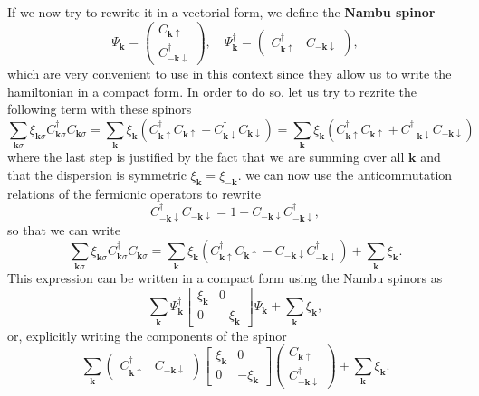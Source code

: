 If we now try to rewrite it in a vectorial form, we define the \textbf{Nambu spinor}
\[
    \Psi_{\mathbf{k}} = \begin{pmatrix}
        C_{\mathbf{k} \uparrow} \\
        C^{\dagger}_{-\mathbf{k} \downarrow}
    \end{pmatrix}, \quad \Psi_{\mathbf{k}}^\dagger = \begin{pmatrix}
        C^{\dagger}_{\mathbf{k} \uparrow} & C_{-\mathbf{k} \downarrow}
    \end{pmatrix},
\]
which are very convenient to use in this context since they allow us to write the hamiltonian in a compact form. In order to do so, let us try to rezrite the following term with these spinors
\[
    \sum_{\mathbf{k} \sigma} \xi_{\mathbf{k}\sigma} C^{\dagger}_{\mathbf{k} \sigma} C_{\mathbf{k} \sigma} = \sum_{\mathbf{k}} \xi_{\mathbf{k}} (C^{\dagger}_{\mathbf{k} \uparrow} C_{\mathbf{k} \uparrow} + C^{\dagger}_{\mathbf{k} \downarrow} C_{\mathbf{k} \downarrow}) = \sum_{\mathbf{k}} \xi_{\mathbf{k}} (C^{\dagger}_{\mathbf{k} \uparrow} C_{\mathbf{k} \uparrow} + C^{\dagger}_{-\mathbf{k} \downarrow} C_{-\mathbf{k} \downarrow})
\]
where the last step is justified by the fact that we are summing over all \(\mathbf{k}\) and that the dispersion is symmetric \(\xi_{\mathbf{k}} = \xi_{-\mathbf{k}}\). we can now use the anticommutation relations of the fermionic operators to rewrite
\[
    C^{\dagger}_{-\mathbf{k} \downarrow} C_{-\mathbf{k} \downarrow} = 1 - C_{-\mathbf{k} \downarrow} C^{\dagger}_{-\mathbf{k} \downarrow},
\]
so that we can write
\[
    \sum_{\mathbf{k} \sigma} \xi_{\mathbf{k}\sigma} C^{\dagger}_{\mathbf{k} \sigma} C_{\mathbf{k} \sigma} = \sum_{\mathbf{k}} \xi_{\mathbf{k}} (C^{\dagger}_{\mathbf{k} \uparrow} C_{\mathbf{k} \uparrow} - C_{-\mathbf{k} \downarrow} C^{\dagger}_{-\mathbf{k} \downarrow}) + \sum_{\mathbf{k}} \xi_{\mathbf{k}}.
\]
This expression can be written in a compact form using the Nambu spinors as
\[
    \sum_{\mathbf{k}} \Psi_{\mathbf{k}}^\dagger \begin{bmatrix}
        \xi_{\mathbf{k}} & 0                 \\
        0                & -\xi_{\mathbf{k}}
    \end{bmatrix} \Psi_{\mathbf{k}} + \sum_{\mathbf{k}} \xi_{\mathbf{k}},
\]
or, explicitly writing the components of the spinor
\[
    \sum_{\mathbf{k}} \begin{pmatrix}
        C^{\dagger}_{\mathbf{k} \uparrow} & C_{-\mathbf{k} \downarrow}
    \end{pmatrix} \begin{bmatrix}
        \xi_{\mathbf{k}} & 0                 \\
        0                & -\xi_{\mathbf{k}}
    \end{bmatrix} \begin{pmatrix}
        C_{\mathbf{k} \uparrow} \\
        C^{\dagger}_{-\mathbf{k} \downarrow}
    \end{pmatrix} + \sum_{\mathbf{k}} \xi_{\mathbf{k}}.
\]

